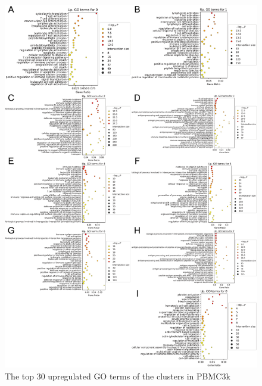 \documentclass{article}
\begin{document}
\begin{figure}[htb]
  \centering
  \includegraphics[scale=0.75]{./figs/exported/figure_s3.png}
  \caption{The top 30 upregulated GO terms of the clusters in PBMC3k}
  \label{fig_s3}
\end{figure}
\end{document}

